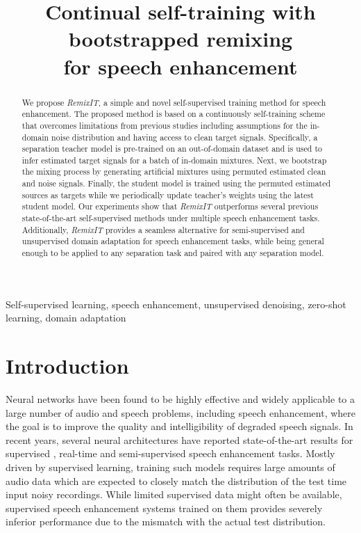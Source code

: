 \documentclass{article}
\title{Continual self-training with bootstrapped remixing \\ for speech enhancement}
\begin{document}
\ninept
\maketitle
\begin{abstract}
We propose \textit{RemixIT}, a simple and novel self-supervised training method for speech enhancement. The proposed method is based on a continuously self-training scheme that overcomes limitations from previous studies including assumptions for the in-domain noise distribution and having access to clean target signals. Specifically, a separation teacher model is pre-trained on an out-of-domain dataset and is used to infer estimated target signals for a batch of in-domain mixtures. Next, we bootstrap the mixing process by generating artificial mixtures using permuted estimated clean and noise signals. Finally, the student model is trained using the permuted estimated sources as targets while we periodically update teacher's weights using the latest student model. Our experiments show that \textit{RemixIT} outperforms several previous state-of-the-art self-supervised methods under multiple speech enhancement tasks. Additionally, \textit{RemixIT} provides a seamless alternative for semi-supervised and unsupervised domain adaptation for speech enhancement tasks, while being general enough to be applied to any separation task and paired with any separation model.

\end{abstract}

\begin{keywords}
Self-supervised learning, speech enhancement, unsupervised denoising, zero-shot learning, domain adaptation
\end{keywords}
\section{Introduction}
\label{sec:intro}
Neural networks have been found to be highly effective and widely applicable to a large number of audio and speech problems, including speech enhancement, where the goal is to improve the quality and intelligibility of degraded speech signals. In recent years, several neural architectures have reported state-of-the-art results for supervised \cite{pandey2021dense}, real-time \cite{hao2021fullsubnet} and semi-supervised \cite{Isik2020PoCONetSpeechEnhacement} speech enhancement tasks. Mostly driven by supervised learning, training such models requires large amounts of audio data which are expected to closely match the distribution of the test time input noisy recordings. While limited supervised data might often be available, supervised speech enhancement systems trained on them provides severely inferior performance due to the mismatch with the actual test distribution. 
\end{document}
